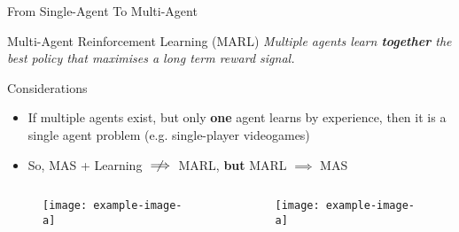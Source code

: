 \documentclass[presentation]{beamer}\mode<presentation>{\usetheme{AMSBolognaFC}}
\begin{document}
\begin{frame}[c]{From Single-Agent To Multi-Agent}
	\begin{alertblock}{Multi-Agent Reinforcement Learning (MARL)}
		\centering
		\emph{Multiple agents learn \textbf{together} the best policy that maximises
	a long term reward signal.}
	\end{alertblock}
	\begin{exampleblock}{Considerations}
		\begin{itemize}
			\item If multiple agents exist, but only \textbf{one} agent learns by experience, then it is a single agent problem (e.g. single-player videogames)
			\item So, MAS + Learning $\centernot\implies$ MARL, \textbf{but} MARL $\implies$ MAS
		\end{itemize}
	\end{exampleblock}
	\begin{columns}
		\begin{column}{0.5\textwidth}		
			\begin{figure}
				\texttt{[image: example-image-a]}
			\end{figure}
		\end{column}
		\begin{column}{0.5\textwidth}	
			\begin{figure}
				\texttt{[image: example-image-a]}
			\end{figure}
		\end{column}
	\end{columns}
\end{frame}
\end{document}
